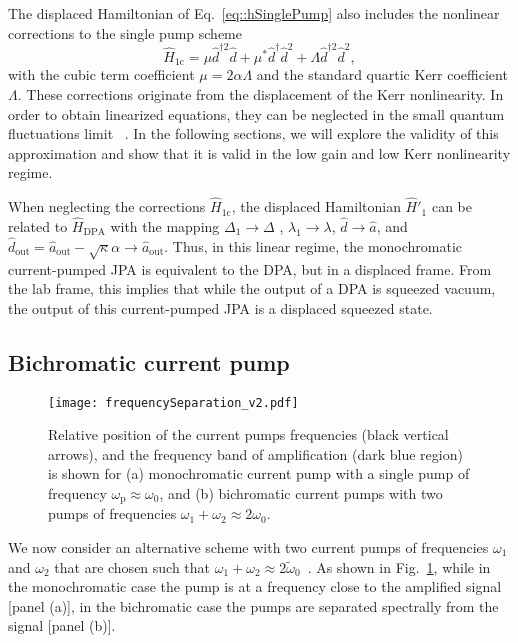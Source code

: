 \documentclass[pra,twocolumn,superscriptaddress]{revtex4-1}
\newcommand{\dhat}[0]{\hat{d}}
\newcommand{\lsp}[0]{\lambda_{\mathrm{1}}}
\newcommand{\Dsp}[0]{\Delta_{\mathrm{1}}}
\newcommand{\corrSinglePump}[0]{\hat{H}_{\mathrm{1c}}}
\newcommand{\aout}[0]{\hat{a}_{\mathrm{out}}}
\newcommand{\dout}[0]{\hat{d}_{\mathrm{out}}}
\begin{document}
The displaced Hamiltonian of Eq.~\eqref{eq::hSinglePump} also includes
the nonlinear corrections to the single pump scheme
\begin{equation}
	\corrSinglePump =  \mu  \dhat^{\dagger 2} \dhat + \mu^*\dhat^\dagger \dhat^2 
	+ \Lambda \dhat^{\dagger 2} \dhat^2,
\end{equation}
 with the cubic term coefficient $\mu = 2 \alpha \Lambda$ and the standard quartic Kerr coefficient $\Lambda$. 
These corrections originate from the displacement of the Kerr nonlinearity.
In order to obtain linearized equations, they can be neglected in the small quantum fluctuations limit ~\cite{Yurke:2006fk}.
% 
 In the following sections, we will explore the validity of this approximation and show that it is valid in the low gain and low Kerr nonlinearity regime.

When neglecting the corrections $\corrSinglePump$, the displaced Hamiltonian $\hat{H}'_{\mathrm{1}}$ can be related to $\hat{H}_{\mathrm{DPA}}$ with the mapping
$\Dsp \rightarrow \Delta$ , 
$\lsp \rightarrow \lambda$, 
$\hat {d} \rightarrow \hat {a} $,
 and 
 $\dout = \aout - \sqrt{\kappa} \alpha  \rightarrow \aout$. 
Thus, in this linear regime, the monochromatic current-pumped JPA is equivalent to the DPA, but in a displaced frame. From the lab frame, this implies that while the output of a DPA is squeezed vacuum, the output of this current-pumped JPA is a displaced squeezed state.


\subsection{Bichromatic current pump}\label{subsec::doublePump}

\begin{figure}[tb]
	\texttt{[image: frequencySeparation\_v2.pdf]}
	\caption{
	Relative position of the current pumps frequencies (black vertical arrows), and the frequency band of amplification (dark blue region) is shown for
	(a) monochromatic current pump with a single pump of frequency $\omega_{\mathrm{p}} \approx \omega_0$, and 
	(b) bichromatic current pumps with two pumps of frequencies $\omega_1 + \omega_2 \approx 2 \omega_0$.
	}
	\label{fig:frequencySpacePump}
\end{figure}

We now consider an alternative scheme with two current pumps of frequencies 
$\omega_1$ and $\omega_2$ that are chosen such that
$\omega_1+\omega_2 \approx 2\tilde{\omega}_0$~\cite{Kamal:2009uq}. As shown in Fig.~\ref{fig:frequencySpacePump}, while in the monochromatic case the pump is at a frequency close to the amplified signal [panel (a)], in the bichromatic case the pumps are separated spectrally from the signal [panel (b)]. 
\end{document}
